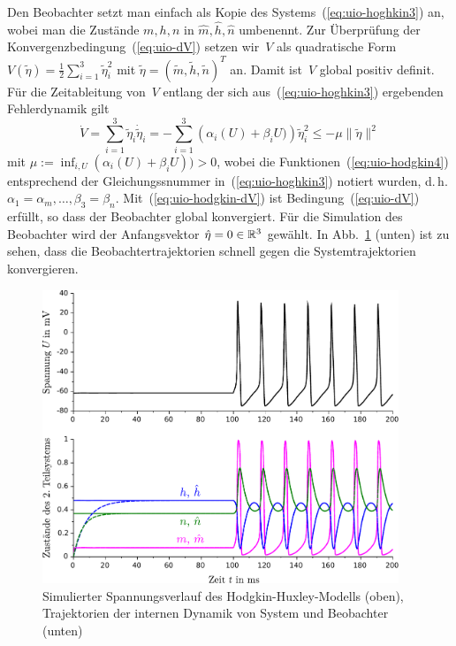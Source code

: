 \begin{example}
Den Beobachter setzt man einfach als Kopie des Systems~(\ref{eq:uio-hoghkin3})
an, wobei man die Zustände $m,h,n$ in $\hat{m},\hat{h},\hat{n}$
umbenennt. Zur Überprüfung der Konvergenzbedingung~(\ref{eq:uio-dV})
setzen wir~$V$ als quadratische Form $V(\tilde{\eta})=\tfrac{1}{2}\sum_{i=1}^{3}\tilde{\eta}_{i}^{2}$
mit $\tilde{\eta}=(\tilde{m},\tilde{h},\tilde{n})^{T}$ an. Damit
ist~$V$ global positiv definit. Für die Zeitableitung von~$V$
entlang der sich aus~(\ref{eq:uio-hoghkin3}) ergebenden Fehlerdynamik
gilt 
\begin{equation}
\dot{V}=\sum_{i=1}^{3}\tilde{\eta}_{i}\dot{\tilde{\eta}}_{i}=-\sum_{i=1}^{3}\left(\alpha_{i}(U)+\beta_{i}U)\right)\tilde{\eta}_{i}^{2}\leq-\mu\|\tilde{\eta}\|^{2}\label{eq:uio-hodgkin-dV}
\end{equation}
mit $\mu:=\inf_{i,U}(\alpha_{i}(U)+\beta_{i}U))>0$, wobei die Funktionen~(\ref{eq:uio-hodgkin4})
entsprechend der Gleichungssnummer in~(\ref{eq:uio-hoghkin3}) notiert
wurden, d.\,h. $\alpha_{1}=\alpha_{m},\ldots,\beta_{3}=\beta_{n}$.
Mit~(\ref{eq:uio-hodgkin-dV}) ist Bedingung~(\ref{eq:uio-dV})
erfüllt, so dass der Beobachter global konvergiert. Für die Simulation
des Beobachter wird der Anfangsvektor $\hat{\eta}=0\in{\mathbb{R}}^{3}$ gewählt.
In Abb.~\ref{fig:hodgkin-huxley-simulation} (unten) ist zu sehen,
dass die Beobachtertrajektorien schnell gegen die Systemtrajektorien
konvergieren.

\begin{figure}
\begin{centering}
\includegraphics[width=0.95\textwidth]{Hodgkin_Sim}
\par\end{centering}
\caption{Simulierter Spannungsverlauf des Hodgkin-Huxley-Modells (oben), Trajektorien
der internen Dynamik von System und Beobachter (unten)\label{fig:hodgkin-huxley-simulation}}

\end{figure}
\end{example}

